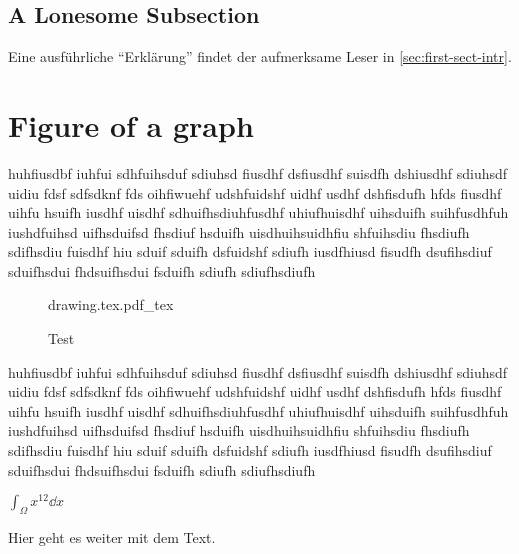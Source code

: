 \subsection{A Lonesome Subsection}%
\label{sec:lonesome-subsection}
Eine ausführliche \enquote{Erklärung} findet der aufmerksame Leser in \cref{sec:first-sect-intr}.

\section{Figure of a graph}

huhfiusdbf iuhfui sdhfuihsduf sdiuhsd fiusdhf dsfiusdhf suisdfh dshiusdhf sdiuhsdf uidiu
fdsf sdfsdknf fds oihfiwuehf udshfuidshf uidhf usdhf dshfisdufh hfds fiusdhf uihfu hsuifh
iusdhf uisdhf sdhuifhsdiuhfusdhf uhiufhuisdhf uihsduifh suihfusdhfuh iushdfuihsd
uifhsduifsd fhsdiuf hsduifh uisdhuihsuidhfiu shfuihsdiu fhsdiufh sdifhsdiu fuisdhf hiu
sduif sduifh dsfuidshf sdiufh iusdfhiusd fisudfh dsufihsdiuf sduifhsdui fhdsuifhsdui
fsduifh sdiufh sdiufhsdiufh

\begin{figure}[h]
	\centering
	\def\svgwidth{0.4\textwidth}
	{drawing.tex.pdf_tex}
	\caption{Test}
\end{figure}

huhfiusdbf iuhfui sdhfuihsduf sdiuhsd fiusdhf dsfiusdhf suisdfh dshiusdhf sdiuhsdf uidiu
fdsf sdfsdknf fds oihfiwuehf udshfuidshf uidhf usdhf dshfisdufh hfds fiusdhf uihfu hsuifh
iusdhf uisdhf sdhuifhsdiuhfusdhf uhiufhuisdhf uihsduifh suihfusdhfuh iushdfuihsd
uifhsduifsd fhsdiuf hsduifh uisdhuihsuidhfiu shfuihsdiu fhsdiufh sdifhsdiu fuisdhf hiu
sduif sduifh dsfuidshf sdiufh iusdfhiusd fisudfh dsufihsdiuf sduifhsdui fhdsuifhsdui
fsduifh sdiufh sdiufhsdiufh

\clearpage{}
$ \int_{\Omega}^{} x^{12} \dd{x} $

Hier geht es weiter mit dem Text.

